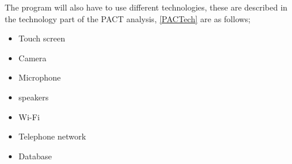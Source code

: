   
The program will also have to use different technologies, these are described in the technology part of the PACT analysis, \cref{PACTech} are as follows;
  \begin{itemize}
    \item Touch screen
    \item Camera
    \item Microphone
    \item speakers
    \item Wi-Fi
    \item Telephone network
    \item Database
  \end{itemize}